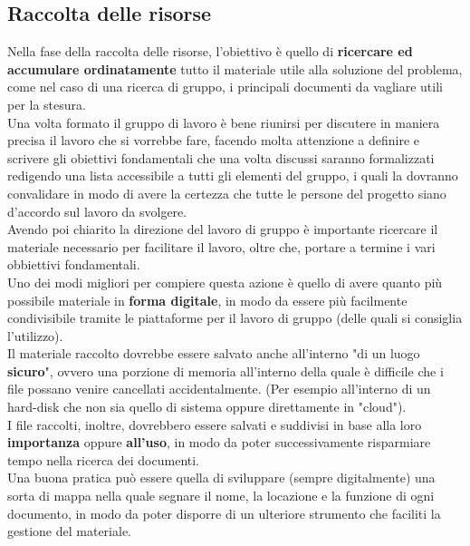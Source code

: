 \documentclass[11pt,a4paper]{article}
\begin{document}
	\subsection{Raccolta delle risorse}
	Nella fase della raccolta delle risorse, l'obiettivo è quello di \textbf{ricercare ed accumulare ordinatamente} tutto il materiale utile alla soluzione del problema, come nel caso di una ricerca di gruppo, i principali documenti da vagliare utili per la stesura.\\
	Una volta formato il gruppo di lavoro è bene riunirsi per discutere in maniera precisa il lavoro che si vorrebbe fare, facendo molta attenzione a definire e scrivere gli obiettivi fondamentali che una volta discussi saranno formalizzati redigendo una lista accessibile a tutti gli elementi del gruppo, i quali la dovranno convalidare in modo di avere la certezza che tutte le persone del progetto siano d'accordo sul lavoro da svolgere.\\
	Avendo poi chiarito la direzione del lavoro di gruppo è importante ricercare il materiale necessario per facilitare il lavoro, oltre che, portare a termine i vari obbiettivi fondamentali.\\
	Uno dei modi migliori per compiere questa azione è quello di avere quanto più possibile materiale in \textbf{forma digitale}, in modo da essere più facilmente condivisibile tramite le piattaforme per il lavoro di gruppo (delle quali si consiglia l'utilizzo).\\
	Il materiale raccolto dovrebbe essere salvato anche all'interno "di un luogo \textbf{sicuro}", ovvero una porzione di memoria all'interno della quale è difficile che i file possano venire cancellati accidentalmente. (Per esempio all'interno di un hard-disk che non sia quello di sistema oppure direttamente in "cloud").\\
	I file raccolti, inoltre, dovrebbero essere salvati e suddivisi in base alla loro \textbf{importanza} oppure \textbf{all'uso}, in modo da poter successivamente risparmiare tempo nella ricerca dei documenti.\\
	Una buona pratica può essere quella di sviluppare (sempre digitalmente) una sorta di mappa nella quale segnare il nome, la locazione e la funzione di ogni documento, in modo da poter disporre di un ulteriore strumento che faciliti la gestione del materiale.\\
	
\end{document}
